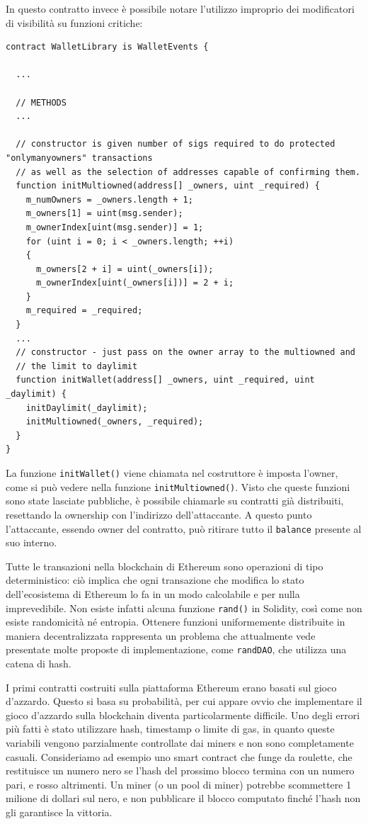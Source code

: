 In questo contratto invece è possibile notare l'utilizzo improprio dei modificatori di visibilità su funzioni critiche:
\begin{lstlisting}
contract WalletLibrary is WalletEvents {
  
  ... 
  
  // METHODS
  ...
  
  // constructor is given number of sigs required to do protected "onlymanyowners" transactions
  // as well as the selection of addresses capable of confirming them.
  function initMultiowned(address[] _owners, uint _required) {
    m_numOwners = _owners.length + 1;
    m_owners[1] = uint(msg.sender);
    m_ownerIndex[uint(msg.sender)] = 1;
    for (uint i = 0; i < _owners.length; ++i)
    {
      m_owners[2 + i] = uint(_owners[i]);
      m_ownerIndex[uint(_owners[i])] = 2 + i;
    }
    m_required = _required;
  }
  ...
  // constructor - just pass on the owner array to the multiowned and
  // the limit to daylimit
  function initWallet(address[] _owners, uint _required, uint _daylimit) {
    initDaylimit(_daylimit);
    initMultiowned(_owners, _required);
  }
}
\end{lstlisting}
La funzione \texttt{initWallet()} viene chiamata nel costruttore è imposta l'owner, come si può vedere nella funzione \texttt{initMultiowned()}. Visto che queste funzioni sono state lasciate pubbliche, è possibile chiamarle su contratti già distribuiti, resettando la ownership con l'indirizzo dell'attaccante. A questo punto l'attaccante, essendo owner del contratto, può ritirare tutto il \texttt{balance} presente al suo interno.

\vspace{5mm}

Tutte le transazioni nella blockchain di Ethereum sono operazioni di tipo deterministico: ciò implica che ogni transazione che modifica lo stato dell'ecosistema di Ethereum lo fa in un modo calcolabile e per nulla imprevedibile. Non esiste infatti alcuna funzione \texttt{rand()} in Solidity, così come non esiste randomicità né entropia. Ottenere funzioni uniformemente distribuite in maniera decentralizzata rappresenta un problema che attualmente vede presentate molte proposte di implementazione, come \texttt{randDAO}, che utilizza una catena di hash. 

I primi contratti costruiti sulla piattaforma Ethereum erano basati sul gioco d'azzardo. Questo si basa su probabilità, per cui appare ovvio che implementare il gioco d'azzardo sulla blockchain diventa particolarmente difficile. Uno degli errori più fatti è stato utilizzare hash, timestamp o limite di gas, in quanto queste variabili vengono parzialmente controllate dai miners e non sono completamente casuali. Consideriamo ad esempio uno smart contract che funge da roulette, che restituisce un numero nero se l'hash del prossimo blocco termina con un numero pari, e rosso altrimenti. Un miner (o un pool di miner) potrebbe scommettere 1 milione di dollari sul nero, e non pubblicare il blocco computato finché l'hash non gli garantisce la vittoria. 

